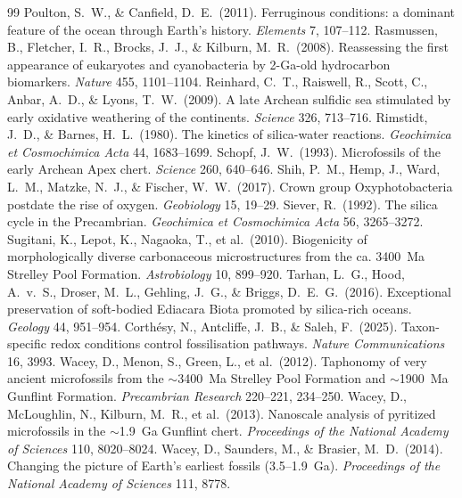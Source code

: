 \documentclass[11pt]{article}
\begin{document}
\begin{thebibliography}{99}
 Poulton, S.~W., \& Canfield, D.~E.\ (2011).
Ferruginous conditions: a dominant feature of the ocean through Earth's history. \textit{Elements} 7,
107--112.
 Rasmussen, B., Fletcher, I.~R., Brocks, J.~J., \&
Kilburn, M.~R.\ (2008). Reassessing the first appearance of eukaryotes and cyanobacteria by
2-Ga-old hydrocarbon biomarkers. \textit{Nature} 455, 1101--1104.
 Reinhard, C.~T., Raiswell, R., Scott, C., Anbar, A.~D.,
\& Lyons, T.~W.\ (2009). A late Archean sulfidic sea stimulated by early oxidative weathering of the
continents. \textit{Science} 326, 713--716.
 Rimstidt, J.~D., \& Barnes, H.~L.\ (1980). The
kinetics of silica-water reactions. \textit{Geochimica et Cosmochimica Acta} 44, 1683--1699.
 Schopf, J.~W.\ (1993). Microfossils of the early Archean Apex
chert. \textit{Science} 260, 640--646.
 Shih, P.~M., Hemp, J., Ward, L.~M., Matzke, N.~J., \& Fischer,
W.~W.\ (2017). Crown group Oxyphotobacteria postdate the rise of oxygen. \textit{Geobiology} 15,
19--29.
 Siever, R.\ (1992). The silica cycle in the Precambrian.
\textit{Geochimica et Cosmochimica Acta} 56, 3265--3272.
 Sugitani, K., Lepot, K., Nagaoka, T., et al.\ (2010).
Biogenicity of morphologically diverse carbonaceous microstructures from the ca. 3400~Ma Strelley
Pool Formation. \textit{Astrobiology} 10, 899--920.
 Tarhan, L.~G., Hood, A.~v.~S., Droser, M.~L., Gehling, J.~G.,
\& Briggs, D.~E.~G.\ (2016). Exceptional preservation of soft-bodied Ediacara Biota promoted by
silica-rich oceans. \textit{Geology} 44, 951--954.
 Corth\'{e}sy, N., Antcliffe, J.~B., \& Saleh, F.\
(2025). Taxon-specific redox conditions control fossilisation pathways. \textit{Nature Communications}
16, 3993.
 Wacey, D., Menon, S., Green, L., et al.\ (2012). Taphonomy of
very ancient microfossils from the $\sim$3400~Ma Strelley Pool Formation and $\sim$1900~Ma Gunflint
Formation. \textit{Precambrian Research} 220--221, 234--250.
 Wacey, D., McLoughlin, N., Kilburn, M.~R., et al.\ (2013).
Nanoscale analysis of pyritized microfossils in the $\sim$1.9~Ga Gunflint chert. \textit{Proceedings
of the National Academy of Sciences} 110, 8020--8024.
 Wacey, D., Saunders, M., \& Brasier, M.~D.\ (2014).
Changing the picture of Earth's earliest fossils (3.5--1.9~Ga). \textit{Proceedings of the National
Academy of Sciences} 111, 8778.
\end{thebibliography}
\end{document}
